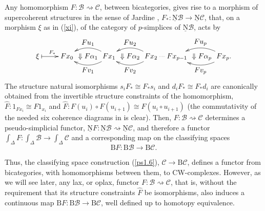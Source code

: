 \documentclass[]{amsart}
\begin{document}
Any homomorphism $F:{\ensuremath{\mathcal{B}}}\rightsquigarrow{\ensuremath{\mathcal{C}}}$, between bicategories, gives rise to a morphism of
supercoherent structures in the sense of Jardine \cite{jardine}, $F_*:{\ensuremath{\underline{\mathrm{N}}}}{\ensuremath{\mathcal{B}}}\to {\ensuremath{\underline{\mathrm{N}}}}{\ensuremath{\mathcal{C}}}$, that, on
a morphism $\xi$ as in (\ref{xi}), of the category of $p$-simplices of ${\ensuremath{\underline{\mathrm{N}}}}{\ensuremath{\mathcal{B}}}$, acts by
$$\xymatrix@C=0.5pt@R=0.5pt{
\xi \ar@{|-{>}}[rrrr]^{F_*} &&~&& Fx_0  &{\Downarrow F\alpha_1} & Fx_1\ar@/^1pc/[ll]^{\textstyle
Fv_1} \ar@/_1pc/[ll]_-{\textstyle Fu_1}  & {\Downarrow F\alpha_2} & Fx_2 \ar@/^1pc/[ll]^{\textstyle
Fv_2} \ar@/_1pc/[ll]_-{\textstyle Fu_2}\ar@{.}[rr] && Fx_{p-1}  & {\Downarrow F\alpha_p} &
Fx_p.\ar@/^1pc/[ll]^{\textstyle Fv_p} \ar@/_1pc/[ll]_-{\textstyle Fu_p}}$$ The structure natural
isomorphisms $s_i F_* \cong F_*s_i$ and $d_iF_*\cong F_* d_i$ are canonically obtained from  the
invertible  structure constraints of the homomorphism, $\widehat{F}:1_{Fx_i}\cong F1_{x_i}$ and
$\widehat{F}: F(u_i)\circ F(u_{i+1})\cong F(u_i\circ u_{i+1})$ (the commutativity of the needed six
coherence diagrams in \cite{jardine} is clear). Then, $F:{\ensuremath{\mathcal{B}}}\rightsquigarrow{\ensuremath{\mathcal{C}}}$ determines a
pseudo-simplicial functor, ${\ensuremath{\underline{\mathrm{N}}}} F:{\ensuremath{\underline{\mathrm{N}}}}{\ensuremath{\mathcal{B}}}\rightsquigarrow {\ensuremath{\underline{\mathrm{N}}}}{\ensuremath{\mathcal{C}}}$, and therefore a functor
$\int_\Delta \!F:\int_\Delta\!{\ensuremath{\mathcal{B}}}\to \int_\Delta\!{\ensuremath{\mathcal{C}}}$ and a corresponding map on the classifying
spaces $$ {\ensuremath{\mathrm{B}}} F:{\ensuremath{\mathrm{B}}}{\ensuremath{\mathcal{B}}}\to{\ensuremath{\mathrm{B}}}{\ensuremath{\mathcal{C}}}. $$

Thus, the classifying space construction (\ref{ps1.6}), ${\ensuremath{\mathcal{C}}}\to{\ensuremath{\mathrm{B}}} {\ensuremath{\mathcal{C}}}$, defines a functor from
bicategories, with homomorphisms between them, to CW-complexes. However, as we will see later, any
lax, or oplax, functor $F:{\ensuremath{\mathcal{B}}}\rightsquigarrow{\ensuremath{\mathcal{C}}}$, that is, without the requirement that its
structure constraints $\widehat{F}$ be isomorphisms, also induces a continuous map ${\ensuremath{\mathrm{B}}}
F:{\ensuremath{\mathrm{B}}}{\ensuremath{\mathcal{B}}}\to{\ensuremath{\mathrm{B}}}{\ensuremath{\mathcal{C}}}$, well defined up to homotopy equivalence.
\end{document}
